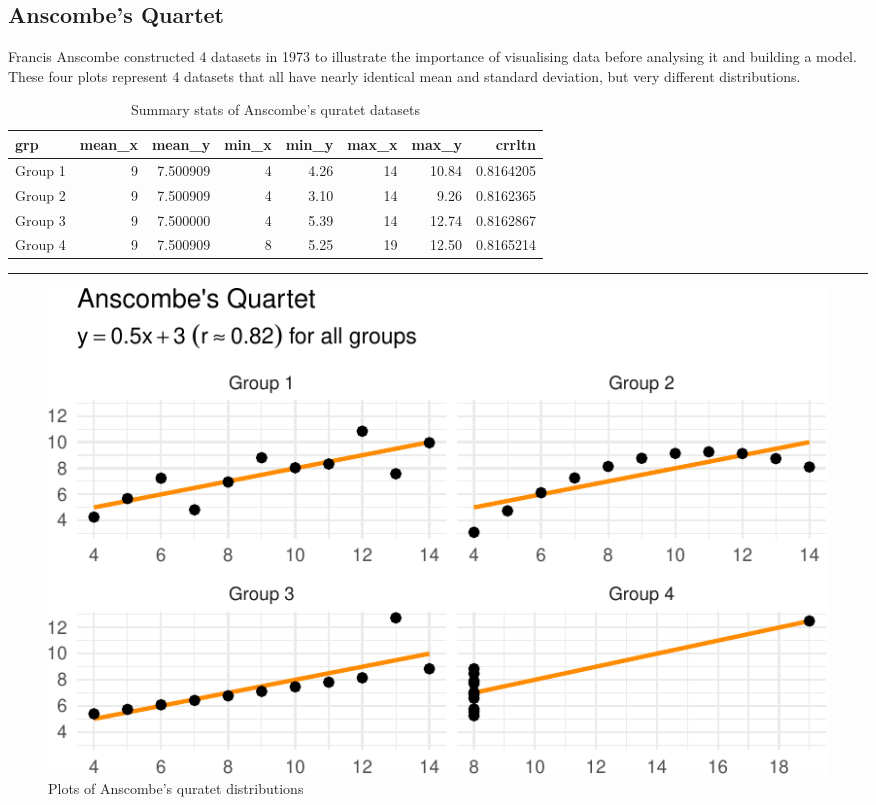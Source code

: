 \documentclass[
  letterpaper,
  DIV=11,
  numbers=noendperiod]{scrartcl}
\begin{document}
\hypertarget{anscombes-quartet}{%
\subsection{Anscombe's Quartet}\label{anscombes-quartet}}

Francis Anscombe constructed 4 datasets in 1973 to illustrate the
importance of visualising data before analysing it and building a model.
These four plots represent 4 datasets that all have nearly identical
mean and standard deviation, but very different distributions.

\hypertarget{tbl-anscombe}{}
\begin{table}
\caption{\label{tbl-anscombe}Summary stats of Anscombe's quratet datasets }\tabularnewline

\centering\begingroup\fontsize{20}{22}\selectfont

\begin{tabular}{l|r|r|r|r|r|r|r}
\hline
grp & mean\_x & mean\_y & min\_x & min\_y & max\_x & max\_y & crrltn\\
\hline
Group 1 & 9 & 7.500909 & 4 & 4.26 & 14 & 10.84 & 0.8164205\\
\hline
Group 2 & 9 & 7.500909 & 4 & 3.10 & 14 & 9.26 & 0.8162365\\
\hline
Group 3 & 9 & 7.500000 & 4 & 5.39 & 14 & 12.74 & 0.8162867\\
\hline
Group 4 & 9 & 7.500909 & 8 & 5.25 & 19 & 12.50 & 0.8165214\\
\hline
\end{tabular}
\endgroup{}
\end{table}

\begin{center}\rule{0.5\linewidth}{0.5pt}\end{center}

\begin{figure}

{\centering \includegraphics{08-desc_stats_en_files/figure-pdf/fig-anscombe-1.pdf}

}

\caption{\label{fig-anscombe}Plots of Anscombe's quratet distributions}

\end{figure}
\end{document}
